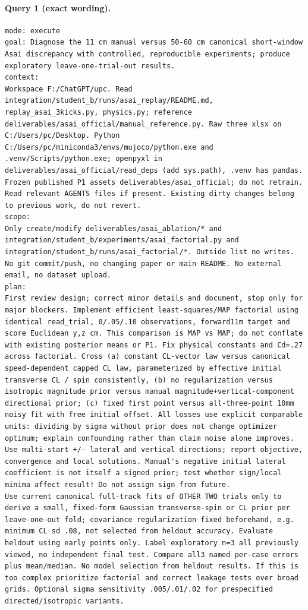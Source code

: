 \documentclass[UTF8,10pt]{ctexart}
\begin{document}
\paragraph{Query 1 (exact wording).}
\begin{Verbatim}[breaklines=true,breakanywhere=true,fontsize=\scriptsize,frame=single,framesep=2pt]
mode: execute
goal: Diagnose the 11 cm manual versus 50-60 cm canonical short-window Asai discrepancy with controlled, reproducible experiments; produce exploratory leave-one-trial-out results.
context:
Workspace F:/ChatGPT/upc. Read integration/student_b/runs/asai_replay/README.md, replay_asai_3kicks.py, physics.py; reference deliverables/asai_official/manual_reference.py. Raw three xlsx on C:/Users/pc/Desktop. Python C:/Users/pc/miniconda3/envs/mujoco/python.exe and .venv/Scripts/python.exe; openpyxl in deliverables/asai_official/read_deps (add sys.path), .venv has pandas. Frozen published P1 assets deliverables/asai_official; do not retrain. Read relevant AGENTS files if present. Existing dirty changes belong to previous work, do not revert.
scope:
Only create/modify deliverables/asai_ablation/* and integration/student_b/experiments/asai_factorial.py and integration/student_b/runs/asai_factorial/*. Outside list no writes. No git commit/push, no changing paper or main README. No external email, no dataset upload.
plan:
First review design; correct minor details and document, stop only for major blockers. Implement efficient least-squares/MAP factorial using identical read_trial, 0/.05/.10 observations, forward11m target and score Euclidean y,z cm. This comparison is MAP vs MAP; do not conflate with existing posterior means or P1. Fix physical constants and Cd=.27 across factorial. Cross (a) constant CL-vector law versus canonical speed-dependent capped CL law, parameterized by effective initial transverse CL / spin consistently, (b) no regularization versus isotropic magnitude prior versus manual magnitude+vertical-component directional prior; (c) fixed first point versus all-three-point 10mm noisy fit with free initial offset. All losses use explicit comparable units: dividing by sigma without prior does not change optimizer optimum; explain confounding rather than claim noise alone improves. Use multi-start +/- lateral and vertical directions; report objective, convergence and local solutions. Manual's negative initial lateral coefficient is not itself a signed prior; test whether sign/local minima affect result! Do not assign sign from future.
Use current canonical full-track fits of OTHER TWO trials only to derive a small, fixed-form Gaussian transverse-spin or CL prior per leave-one-out fold; covariance regularization fixed beforehand, e.g. minimum CL sd .08, not selected from heldout accuracy. Evaluate heldout using early points only. Label exploratory n=3 all previously viewed, no independent final test. Compare all3 named per-case errors plus mean/median. No model selection from heldout results. If this is too complex prioritize factorial and correct leakage tests over broad grids. Optional sigma sensitivity .005/.01/.02 for prespecified directed/isotropic variants.

\end{Verbatim}
\end{document}
